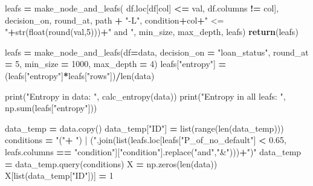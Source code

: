 \documentclass[
]{book}
\newenvironment{Shaded}{\begin{snugshade}}{\end{snugshade}}
\newcommand{\BuiltInTok}[1]{#1}
\newcommand{\ControlFlowTok}[1]{\textcolor[rgb]{0.13,0.29,0.53}{\textbf{#1}}}
\newcommand{\DecValTok}[1]{\textcolor[rgb]{0.00,0.00,0.81}{#1}}
\newcommand{\FloatTok}[1]{\textcolor[rgb]{0.00,0.00,0.81}{#1}}
\newcommand{\NormalTok}[1]{#1}
\newcommand{\OperatorTok}[1]{\textcolor[rgb]{0.81,0.36,0.00}{\textbf{#1}}}
\newcommand{\StringTok}[1]{\textcolor[rgb]{0.31,0.60,0.02}{#1}}
\begin{document}
\begin{Shaded}
\begin{Highlighting}[]
\NormalTok{    leafs }\OperatorTok{=}\NormalTok{ make\_node\_and\_leafs( df.loc[df[col] }\OperatorTok{\textless{}=}\NormalTok{ val, df.columns }\OperatorTok{!=}\NormalTok{ col], decision\_on, round\_at, path }\OperatorTok{+} \StringTok{"{-}L"}\NormalTok{, condition}\OperatorTok{+}\NormalTok{col}\OperatorTok{+}\StringTok{" \textless{}= "}\OperatorTok{+}\BuiltInTok{str}\NormalTok{(}\BuiltInTok{float}\NormalTok{(}\BuiltInTok{round}\NormalTok{(val,}\DecValTok{5}\NormalTok{)))}\OperatorTok{+}\StringTok{" and "}\NormalTok{, min\_size, max\_depth, leafs)}
  \ControlFlowTok{return}\NormalTok{(leafs)}
  
  
  


\NormalTok{leafs }\OperatorTok{=}\NormalTok{ make\_node\_and\_leafs(df}\OperatorTok{=}\NormalTok{data, decision\_on }\OperatorTok{=} \StringTok{"loan\_status"}\NormalTok{, round\_at }\OperatorTok{=} \DecValTok{5}\NormalTok{, min\_size }\OperatorTok{=} \DecValTok{1000}\NormalTok{, max\_depth }\OperatorTok{=} \DecValTok{4}\NormalTok{)}
\NormalTok{leafs[}\StringTok{"entropy"}\NormalTok{] }\OperatorTok{=}\NormalTok{ (leafs[}\StringTok{"entropy"}\NormalTok{]}\OperatorTok{*}\NormalTok{leafs[}\StringTok{"rows"}\NormalTok{])}\OperatorTok{/}\BuiltInTok{len}\NormalTok{(data)}

\BuiltInTok{print}\NormalTok{(}\StringTok{"Entropy in data: "}\NormalTok{, calc\_entropy(data))}
\BuiltInTok{print}\NormalTok{(}\StringTok{"Entropy in all leafs: "}\NormalTok{, np.}\BuiltInTok{sum}\NormalTok{(leafs[}\StringTok{"entropy"}\NormalTok{]))}


\NormalTok{data\_temp }\OperatorTok{=}\NormalTok{ data.copy()}
\NormalTok{data\_temp[}\StringTok{"ID"}\NormalTok{] }\OperatorTok{=} \BuiltInTok{list}\NormalTok{(}\BuiltInTok{range}\NormalTok{(}\BuiltInTok{len}\NormalTok{(data\_temp)))}
\NormalTok{conditions }\OperatorTok{=} \StringTok{"("}\OperatorTok{+} \StringTok{") | ("}\NormalTok{.join(}\BuiltInTok{list}\NormalTok{(leafs.loc[leafs[}\StringTok{"P\_of\_no\_default"}\NormalTok{] }\OperatorTok{\textless{}} \FloatTok{0.65}\NormalTok{, leafs.columns }\OperatorTok{==} \StringTok{"condition"}\NormalTok{][}\StringTok{"condition"}\NormalTok{].replace(}\StringTok{"and"}\NormalTok{,}\StringTok{"\&"}\NormalTok{)))}\OperatorTok{+}\StringTok{")"}
\NormalTok{data\_temp }\OperatorTok{=}\NormalTok{ data\_temp.query(conditions)}
\NormalTok{X }\OperatorTok{=}\NormalTok{ np.zeros(}\BuiltInTok{len}\NormalTok{(data))}
\NormalTok{X[}\BuiltInTok{list}\NormalTok{(data\_temp[}\StringTok{"ID"}\NormalTok{])] }\OperatorTok{=} \DecValTok{1}


\end{Highlighting}
\end{Shaded}
\end{document}
